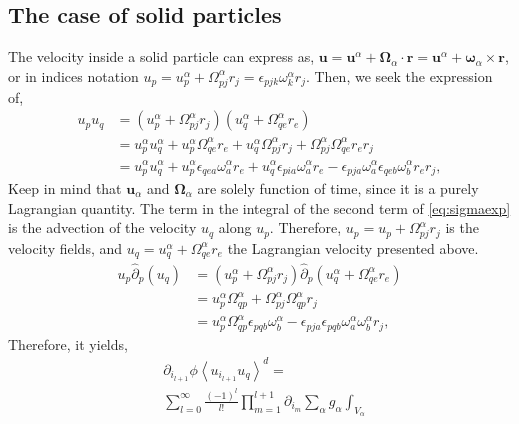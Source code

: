 {\subsection{The case of solid particles}
The velocity inside a solid particle can express as, $\bm{u} = \bm{u}^\alpha + \bm{\Omega}_\alpha\cdot\bm{r} = \bm{u}^\alpha + \bm{\omega}_\alpha\times\bm{r}$, or in indices notation $u_p = u^\alpha_p + \Omega_{pj}^\alpha r_j = \epsilon_{pjk} \omega_k^\alpha r_j$.
Then, we seek the expression of, 
\begin{align*}
    u_pu_q &= (u^\alpha_p + \Omega_{pj}^\alpha r_j)(u^\alpha_q + \Omega_{qe}^\alpha r_e)\\
           &= u^\alpha_pu^\alpha_q
           + u^\alpha_p\Omega_{qe}^\alpha r_e
           + u^\alpha_q\Omega_{pj}^\alpha r_j
           +\Omega_{pj}^\alpha \Omega_{qe}^\alpha r_e r_j\\
           &= u^\alpha_p u^\alpha_q
           + u^\alpha_p \epsilon_{qea}\omega^\alpha_a r_e
           + u^\alpha_q \epsilon_{pia} \omega^\alpha_a r_e
           -\epsilon_{pja} \omega^\alpha_a \epsilon_{qeb}\omega^\alpha_b   r_e r_j,
\end{align*}
Keep in mind that $\bm{u}_\alpha$ and $\bm{\Omega}_\alpha$ are solely function of time, since it is a purely Lagrangian quantity.
The term in the integral of the second term of \ref{eq:sigmaexp} is the advection of the velocity $u_q$ along $u_p$.
Therefore, $u_p = u_p + \Omega_{pj}^\alpha r_j$ is the velocity fields, and $u_q = u^\alpha_q + \Omega_{qe}^\alpha r_e$ the Lagrangian velocity presented above.
\begin{align*}
    u_p\hat{\partial}_p(u_q)
    &= (u_p^\alpha + \Omega_{pj}^\alpha r_j) \hat{\partial}_p(u^\alpha_q + \Omega_{qe}^\alpha r_e)\\
    &= u_p^\alpha \Omega^\alpha_{qp} 
    + \Omega_{pj}^\alpha  \Omega_{qp}^\alpha r_j \\
    &= u_p^\alpha \Omega^\alpha_{qp} \epsilon_{pqb} \omega^\alpha_b 
    - \epsilon_{pja}  \epsilon_{pqb} \omega^\alpha_a\omega^\alpha_b r_j,
\end{align*}
Therefore, it yields,
\begin{align}
    &\partial_{i_{l+1}} \phi \left< u_{i_{l+1}} u_q\right>^d
    =\\
    & \sum_{l=0}^\infty
        \frac{(-1)^l}{l!}
        \prod^{l+1}_{m=1} \partial_{i_m}
        \sum_\alpha  g_\alpha
        \int_{V_\alpha}

\end{align}}
